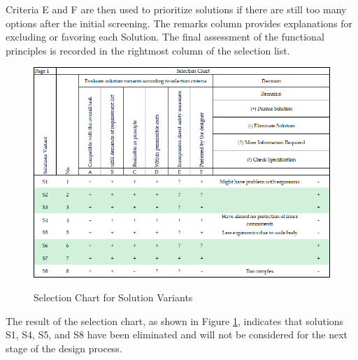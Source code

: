 Criteria E and F are then used to prioritize solutions if there are still too many options after the initial screening. The remarks column provides explanations for excluding or favoring each Solution. The final assessment of the functional principles is recorded in the rightmost column of the selection list.

\begin{figure}[ht!]
    \centering
    {\includegraphics[width=\linewidth]{texs/Part1/chapter3/image/selchart2.png}}
    \caption{Selection Chart for Solution Variants}
    \label{fig:selection-chart-solution-variants}
\end{figure}

The result of the selection chart, as shown in Figure \ref{fig:selection-chart-solution-variants}, indicates that solutions S1, S4, S5, and S8 have been eliminated and will not be considered for the next stage of the design process.

